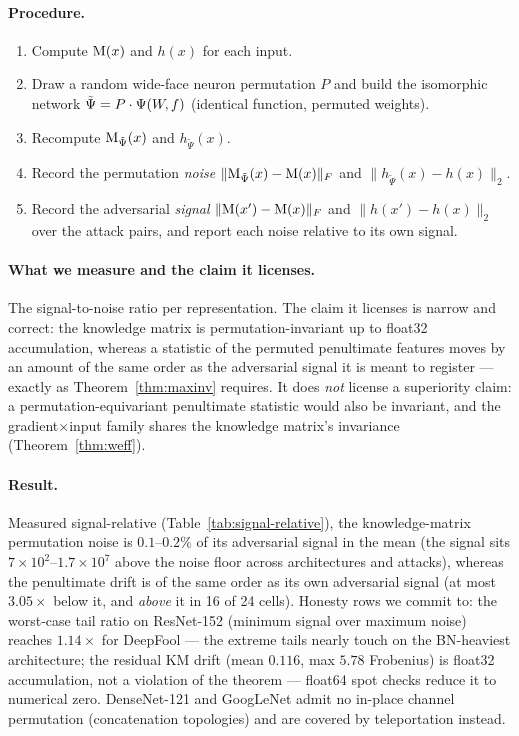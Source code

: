 \paragraph{Procedure.}
\begin{enumerate}
\item Compute $\mathrm{M}(x)$ and $h(x)$ for each input.
\item Draw a random wide-face neuron permutation $P$ and build the
isomorphic network $\tilde\Psi = P \cdot \Psi(W\!,f)$ (identical function, permuted
weights).
\item Recompute $\mathrm{M}_{\tilde\Psi}(x)$ and $h_{\tilde\Psi}(x)$.
\item Record the permutation \emph{noise} $\|\mathrm{M}_{\tilde\Psi}(x)-\mathrm{M}(x)\|_F$
and $\|h_{\tilde\Psi}(x)-h(x)\|_2$.
\item Record the adversarial \emph{signal} $\|\mathrm{M}(x')-\mathrm{M}(x)\|_F$ and
$\|h(x')-h(x)\|_2$ over the attack pairs, and report each noise relative
to its own signal.
\end{enumerate}

\paragraph{What we measure and the claim it licenses.}
The signal-to-noise ratio per representation. The claim it licenses is
narrow and correct: the knowledge matrix is permutation-invariant up to
float32 accumulation, whereas a statistic of the permuted penultimate
features moves by an amount of the same order as the adversarial signal
it is meant to register --- exactly as Theorem~\ref{thm:maxinv} requires.
It does \emph{not} license a superiority claim: a permutation-equivariant
penultimate statistic would also be invariant, and the gradient$\times$input
family shares the knowledge matrix's invariance (Theorem~\ref{thm:weff}).

\paragraph{Result.}
Measured signal-relative (Table~\ref{tab:signal-relative}), the
knowledge-matrix permutation noise is $0.1$--$0.2\%$ of its
adversarial signal in the mean (the signal sits
$7{\times}10^{2}$--$1.7{\times}10^{7}$ above the noise floor across
architectures and attacks), whereas the penultimate drift is of the
same order as its own adversarial signal (at most $3.05\times$ below it,
and \emph{above} it in 16 of 24 cells). Honesty rows we commit to: the
worst-case tail ratio on ResNet-152 (minimum signal over maximum noise)
reaches $1.14\times$ for DeepFool --- the extreme tails nearly touch on
the BN-heaviest architecture; the residual KM drift (mean $0.116$, max
$5.78$ Frobenius) is float32 accumulation, not a violation of the
theorem --- float64 spot checks reduce it to numerical zero. DenseNet-121
and GoogLeNet admit no in-place channel permutation (concatenation
topologies) and are covered by teleportation instead.

